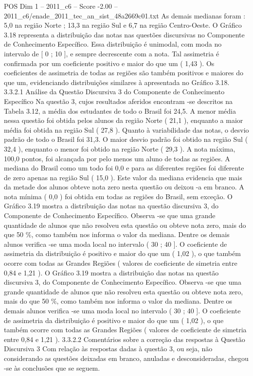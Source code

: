 \begin{textsample}{POS Dim 1 – 2011\_c6 – Score -2.00 – 2011\_c6/enade\_2011\_tec\_an\_sist\_48a2669c01.txt}
As demais medianas foram : 5,0 na região Norte ; 13,3 na região Sul e 6,7 na região Centro-Oeste.
O Gráfico 3.18 representa a distribuição das notas nas questões discursivas no Componente de Conhecimento Específico.
Essa distribuição é unimodal, com moda no intervalo de [ 0 ; 10 ], e sempre decrescente com a nota.
Tal assimetria é confirmada por um coeficiente positivo e maior do que um ( 1,43 ).
Os coeficientes de assimetria de todas as regiões são também positivos e maiores do que um, evidenciando distribuições similares à apresentada no Gráfico 3.18. 3.3.2.1 Análise da Questão Discursiva 3 do Componente de Conhecimento Específico Na questão 3, cujos resultados aferidos encontram -se descritos na Tabela 3.12, a média dos estudantes de todo o Brasil foi 24,5.
A menor média nessa questão foi obtida pelos alunos da região Norte ( 21,1 ), enquanto a maior média foi obtida na região Sul ( 27,8 ).
Quanto à variabilidade das notas, o desvio padrão de todo o Brasil foi 31,3.
O maior desvio padrão foi obtido na região Sul ( 32,4 ), enquanto o menor foi obtido na região Norte ( 29,3 ).
A nota máxima, 100,0 pontos, foi alcançada por pelo menos um aluno de todas as regiões.
A mediana do Brasil como um todo foi 0,0 e para as diferentes regiões foi diferente de zero apenas na região Sul ( 15,0 ).
Este valor da mediana evidencia que mais da metade dos alunos obteve nota zero nesta questão ou deixou -a em branco.
A nota mínima ( 0,0 ) foi obtida em todas as regiões do Brasil, sem exceção.
O Gráfico 3.19 mostra a distribuição das notas na questão discursiva 3, do Componente de Conhecimento Específico.
Observa -se que uma grande quantidade de alunos que não resolveu esta questão ou obteve nota zero, mais do que 50 \%, como também nos informa o valor da mediana.
Dentre os demais alunos verifica -se uma moda local no intervalo ( 30 ; 40 ].
O coeficiente de assimetria da distribuição é positivo e maior do que um ( 1,02 ), o que também ocorre com todas as Grandes Regiões ( valores de coeficiente de simetria entre 0,84 e 1,21 ).
O Gráfico 3.19 mostra a distribuição das notas na questão discursiva 3, do Componente de Conhecimento Específico.
Observa -se que uma grande quantidade de alunos que não resolveu esta questão ou obteve nota zero, mais do que 50 \%, como também nos informa o valor da mediana.
Dentre os demais alunos verifica -se uma moda local no intervalo ( 30 ; 40 ].
O coeficiente de assimetria da distribuição é positivo e maior do que um ( 1,02 ), o que também ocorre com todas as Grandes Regiões ( valores de coeficiente de simetria entre 0,84 e 1,21 ). 3.3.2.2 Comentários sobre a correção das respostas à Questão Discursiva 3 Com relação às respostas dadas à questão 3, ou seja, não considerando as questões deixadas em branco, anuladas e desconsideradas, chegou -se às conclusões que se seguem.

\end{textsample}
